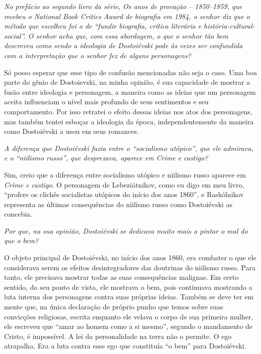 \medskip

\emph{No prefácio ao segundo livro da série, \emph{Os anos de provação -- 1850--1859}, que recebeu o \emph{National Book Critics Award} de biografia em 1984, o
senhor diz que o método que escolheu foi o de ``fundir biografia, crítica
literária e história-cultural-social''. O senhor acha que, com essa
abordagem, o que o senhor tão bem descreveu como sendo a ideologia de
Dostoiévski pode às vezes ser confundida com a interpretação que o
senhor fez de alguns personagens?}

Só posso esperar que esse tipo de confusão mencionadas não seja o caso.
Uma boa parte do gênio de Dostoievski, na minha opinião, é sua
capacidade de mostrar a fusão entre ideologia e personagem, a maneira
como as ideias que um personagem aceita influenciam o nível mais
profundo de seus sentimentos e seu comportamento. Por isso retratei o
efeito dessas ideias nos atos dos personagens, mas também tentei esboçar
a ideologia da época, independentemente da maneira como Dostoiévski a
usou em seus romances.

\medskip

\emph{A diferença que Dostoiévski fazia entre o ``socialismo utópico'', que
ele admirava, e o ``niilismo russo'', que desprezava, aparece em \emph{Crime e
castigo}?}

Sim, creio que a diferença entre socialismo utópico e niilismo russo
aparece em \emph{Crime e castigo}. O personagem de Lebeziátnikov, como eu
digo em meu livro, ``profere os clichês socialistas utópicos do início
dos anos 1860'', e Raskólnikov representa as últimas consequências do
niilismo russo como Dostoiévski as concebia.

\medskip

\emph{Por que, na sua opinião, Dostoiévski se dedicava muito mais a pintar
o mal do que o bem?}

O objeto principal de Dostoiévski, no início dos anos 1860, era combater
o que ele considerava serem os efeitos desintegradores das doutrinas do
niilismo russo. Para tanto, ele precisava mostrar todas as suas
consequências malignas. Em certo sentido, do seu ponto de vista, ele
mostrava o bem, pois continuava mostrando a luta interna dos personagens
contra suas próprias ideias. Também se deve ter em mente que, na única
declaração de próprio punho que temos sobre suas convicções religiosas,
escrita enquanto ele velava o corpo de sua primeira mulher, ele escreveu
que ``amar ao homem como a si mesmo'', segundo o mandamento de Cristo, é
impossível. A lei da personalidade na terra não o permite. O
ego atrapalha. Era a luta contra esse ego que constituía ``o bem'' para
Dostoiévski.

